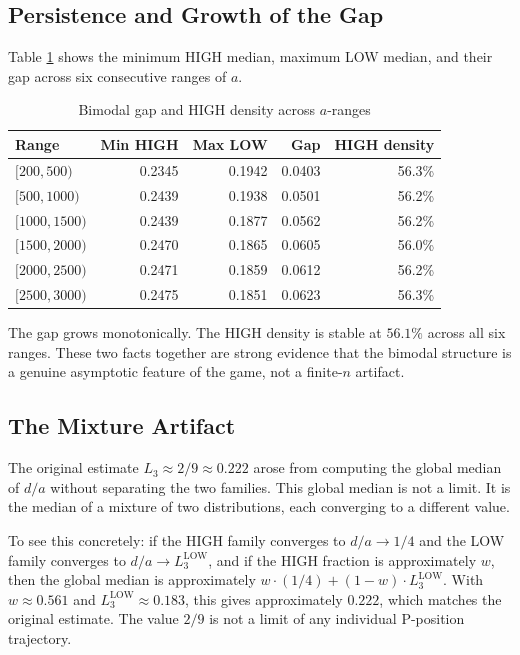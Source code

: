 \documentclass[12pt]{article}
\begin{document}
\subsection{Persistence and Growth of the Gap}

Table \ref{tab:gap} shows the minimum HIGH median, maximum LOW median,
and their gap across six consecutive ranges of $a$.

\begin{table}[h]
\centering
\caption{Bimodal gap and HIGH density across $a$-ranges}
\begin{tabular}{lrrrr}
\toprule
Range & Min HIGH & Max LOW & Gap & HIGH density \\
\midrule
$[200,500)$   & 0.2345 & 0.1942 & 0.0403 & 56.3\% \\
$[500,1000)$  & 0.2439 & 0.1938 & 0.0501 & 56.2\% \\
$[1000,1500)$ & 0.2439 & 0.1877 & 0.0562 & 56.2\% \\
$[1500,2000)$ & 0.2470 & 0.1865 & 0.0605 & 56.0\% \\
$[2000,2500)$ & 0.2471 & 0.1859 & 0.0612 & 56.2\% \\
$[2500,3000)$ & 0.2475 & 0.1851 & 0.0623 & 56.3\% \\
\bottomrule
\end{tabular}
\label{tab:gap}
\end{table}

The gap grows monotonically. The HIGH density is stable at $56.1\%$
across all six ranges. These two facts together are strong evidence
that the bimodal structure is a genuine asymptotic feature of the
game, not a finite-$n$ artifact.

\subsection{The Mixture Artifact}

The original estimate $L_3 \approx 2/9 \approx 0.222$ arose from
computing the global median of $d/a$ without separating the two
families. This global median is not a limit. It is the median of a
mixture of two distributions, each converging to a different value.

To see this concretely: if the HIGH family converges to $d/a \to 1/4$
and the LOW family converges to $d/a \to L_3^{\mathrm{LOW}}$, and
if the HIGH fraction is approximately $w$, then the global median
is approximately $w \cdot (1/4) + (1-w) \cdot L_3^{\mathrm{LOW}}$.
With $w \approx 0.561$ and $L_3^{\mathrm{LOW}} \approx 0.183$, this
gives approximately $0.222$, which matches the original estimate.
The value $2/9$ is not a limit of any individual P-position trajectory.
\end{document}
